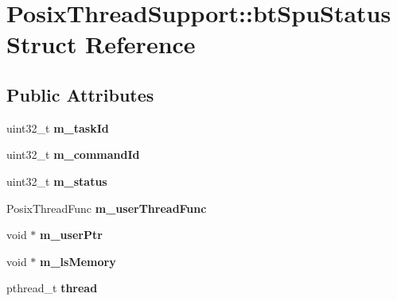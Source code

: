 \hypertarget{struct_posix_thread_support_1_1bt_spu_status}{\section{Posix\+Thread\+Support\+:\+:bt\+Spu\+Status Struct Reference}
\label{struct_posix_thread_support_1_1bt_spu_status}
}
\subsection*{Public Attributes}
\begin{DoxyCompactItemize}
\item 
\hypertarget{struct_posix_thread_support_1_1bt_spu_status_a86bb8befcdfb57908e927af77367a584}{uint32\+\_\+t {\bfseries m\+\_\+task\+Id}}\label{struct_posix_thread_support_1_1bt_spu_status_a86bb8befcdfb57908e927af77367a584}

\item 
\hypertarget{struct_posix_thread_support_1_1bt_spu_status_a9b072032baa92a1560730a3da1020b4d}{uint32\+\_\+t {\bfseries m\+\_\+command\+Id}}\label{struct_posix_thread_support_1_1bt_spu_status_a9b072032baa92a1560730a3da1020b4d}

\item 
\hypertarget{struct_posix_thread_support_1_1bt_spu_status_a11417ac9de8d4365999a9b8bf857aa7b}{uint32\+\_\+t {\bfseries m\+\_\+status}}\label{struct_posix_thread_support_1_1bt_spu_status_a11417ac9de8d4365999a9b8bf857aa7b}

\item 
\hypertarget{struct_posix_thread_support_1_1bt_spu_status_a704dcec15daec0db5847fab4f7908685}{Posix\+Thread\+Func {\bfseries m\+\_\+user\+Thread\+Func}}\label{struct_posix_thread_support_1_1bt_spu_status_a704dcec15daec0db5847fab4f7908685}

\item 
\hypertarget{struct_posix_thread_support_1_1bt_spu_status_a3f0054dcefc3cac0e25923fcc1f78c25}{void $\ast$ {\bfseries m\+\_\+user\+Ptr}}\label{struct_posix_thread_support_1_1bt_spu_status_a3f0054dcefc3cac0e25923fcc1f78c25}

\item 
\hypertarget{struct_posix_thread_support_1_1bt_spu_status_a403a3956d3d82716fbd6cd25c503351f}{void $\ast$ {\bfseries m\+\_\+ls\+Memory}}\label{struct_posix_thread_support_1_1bt_spu_status_a403a3956d3d82716fbd6cd25c503351f}

\item 
\hypertarget{struct_posix_thread_support_1_1bt_spu_status_ac35bd0f2e2b1e5302c6fe2cb3b683419}{pthread\+\_\+t {\bfseries thread}}\label{struct_posix_thread_support_1_1bt_spu_status_ac35bd0f2e2b1e5302c6fe2cb3b683419}


\end{DoxyCompactItemize}
